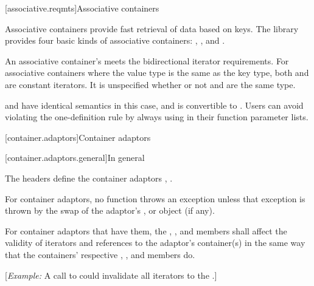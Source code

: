 \setcounter{subsection}{5}

\noindent\makebox[\linewidth]{\rule{\textwidth}{0.4pt}}

[associative.reqmts]{Associative containers}

\pnum
Associative containers provide fast retrieval of data based on keys.
The library provides four basic kinds of associative containers:
,
,
and
.

\noindent\makebox[\linewidth]{\rule{\textwidth}{0.4pt}}

\setcounter{Paras}{5}
\pnum
{}
{An associative container's  meets the bidirectional iterator requirements.}
For associative containers where the value type is the same as the key type, both
and
are constant iterators. It is unspecified whether or not
and
are the same type.
\begin{note}  and  have identical semantics in this case, and  is convertible to . Users can avoid violating the one-definition rule by always using  in their function parameter lists. \end{note}

\setcounter{chapter}{21}
\setcounter{section}{5}
[container.adaptors]{Container adaptors}

[container.adaptors.general]{In general}

\pnum
The headers   define the container adaptors ,
 .

\pnum
For container adaptors, no  function throws an exception unless
that exception is thrown by the swap of the
adaptor's , or
 object (if any).

\begin{addedblock}
\pnum
For container adaptors that have them, the , ,
and  members shall affect the validity of iterators and
references to the adaptor's container(s) in the same way that the containers'
respective , , and  members do.

[\textit{Example:} A call to  could invalidate all iterators to
the .]
\end{addedblock}

